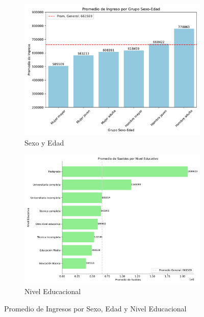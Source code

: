 \documentclass{article}
\begin{document}
	\begin{figure}[htbp]
		\centering
		\begin{subfigure}[b]{0.49\textwidth}
			\centering
			\includegraphics[width=1\textwidth]{../output/fig/PromIngSexoEdad.pdf}
			\caption{\label{5a} Sexo y Edad}
		\end{subfigure}
		\hfill
		\begin{subfigure}[b]{0.49\textwidth}
			\centering
			\includegraphics[width=1\textwidth]{../output/fig/PromIngEduca.pdf}
			\caption{\label{5b} Nivel Educacional}
		\end{subfigure}
		\caption{Promedio de Ingresos por Sexo, Edad y Nivel Educacional}
		\label{05fig}
	\end{figure}
	
\end{document}

